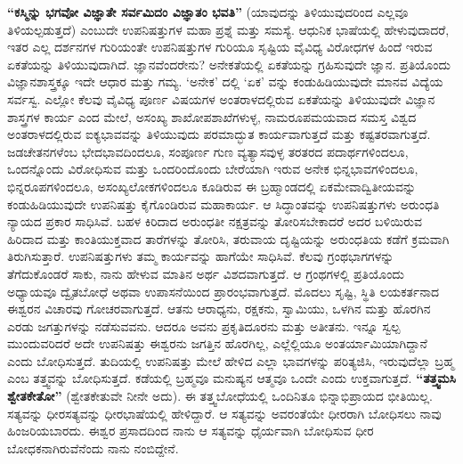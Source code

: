 \textbf{“ಕಸ್ಮಿನ್ನು ಭಗವೋ ವಿಜ್ಞಾತೇ ಸರ್ವಮಿದಂ ವಿಜ್ಞಾತಂ ಭವತಿ”} (ಯಾವುದನ್ನು ತಿಳಿಯುವುದರಿಂದ ಎಲ್ಲವೂ ತಿಳಿಯಲ್ಪಡುತ್ತದೆ) ಎಂಬುದೇ ಉಪನಿಷತ್ತುಗಳ ಮಹಾ ಪ್ರಶ್ನೆ ಮತ್ತು ಸಮಸ್ಯೆ. ಆಧುನಿಕ ಭಾಷೆಯಲ್ಲಿ ಹೇಳುವುದಾದರೆ, ಇತರ ಎಲ್ಲ ದರ್ಶನಗಳ ಗುರಿಯಂತೇ ಉಪನಿಷತ್ತುಗಳ ಗುರಿಯೂ ಸೃಷ್ಟಿಯ ವೈವಿಧ್ಯ ವಿರೋಧಗಳ ಹಿಂದೆ ಇರುವ ಏಕತೆಯನ್ನು ತಿಳಿಯುವುದಾಗಿದೆ. ಜ್ಞಾನವೆಂದರೇನು? ಅನೇಕತೆಯಲ್ಲಿ ಏಕತೆಯನ್ನು ಗ್ರಹಿಸುವುದೇ ಜ್ಞಾನ. ಪ್ರತಿಯೊಂದು ವಿಜ್ಞಾನಶಾಸ್ತ್ರಕ್ಕೂ ಇದೇ ಆಧಾರ ಮತ್ತು ಗಮ್ಯ. ‘ಅನೇಕ’ ದಲ್ಲಿ ‘ಏಕ’ ವನ್ನು ಕಂಡುಹಿಡಿಯುವುದೇ ಮಾನವ ವಿದ್ಯೆಯ ಸರ್ವಸ್ವ. ಎಲ್ಲೋ ಕೆಲವು ವೈವಿಧ್ಯ ಪೂರ್ಣ ವಿಷಯಗಳ ಅಂತರಾಳದಲ್ಲಿರುವ ಏಕತೆಯನ್ನು ತಿಳಿಯುವುದೇ ವಿಜ್ಞಾನ ಶಾಸ್ತ್ರಗಳ ಕಾರ್ಯ ಎಂದ ಮೇಲೆ, ಅಸಂಖ್ಯ ಶಾಖೋಪಶಾಖೆಗಳುಳ್ಳ, ನಾಮರೂಪಮಯವಾದ ಸಮಸ್ತ ವಿಶ್ವದ ಅಂತರಾಳದಲ್ಲಿರುವ ಐಕ್ಯಭಾವವನ್ನು ತಿಳಿಯುವುದು ಪರಮಾದ್ಭುತ ಕಾರ್ಯವಾಗುತ್ತದೆ ಮತ್ತು ಕಷ್ಟತರವಾಗುತ್ತದೆ. ಜಡಚೇತನಗಳೆಂಬ ಭೇದಭಾವದಿಂದಲೂ, ಸಂಪೂರ್ಣ ಗುಣ ವ್ಯತ್ಯಾಸವುಳ್ಳ ತರತರದ ಪದಾರ್ಥಗಳಿಂದಲೂ, ಒಂದನ್ನೊಂದು ವಿರೋಧಿಸುವ ಮತ್ತು ಒಂದರಿಂದೊಂದು ಬೇರೆಯಾಗಿ ಇರುವ ಅನೇಕ ಭಿನ್ನಭಾವಗಳಿಂದಲೂ, ಭಿನ್ನರೂಪಗಳಿಂದಲೂ, ಅಸಂಖ್ಯಲೋಕಗಳಿಂದಲೂ ಕೂಡಿರುವ ಈ ಬ್ರಹ್ಮಾಂಡದಲ್ಲಿ ಏಕಮೇವಾದ್ವಿತೀಯವನ್ನು ಕಂಡುಹಿಡಿಯುವುದೇ ಉಪನಿಷತ್ತು ಕೈಗೊಂಡಿರುವ ಮಹಾಕಾರ್ಯ. ಆ ಸಿದ್ಧಾಂತವನ್ನು ಉಪನಿಷತ್ತುಗಳು ಅರುಂಧತಿ ನ್ಯಾಯದ ಪ್ರಕಾರ ಸಾಧಿಸಿವೆ. ಬಹಳ ಕಿರಿದಾದ ಅರುಂಧತೀ ನಕ್ಷತ್ರವನ್ನು ತೋರಿಸಬೇಕಾದರೆ ಅದರ ಬಳಿಯಿರುವ ಹಿರಿದಾದ ಮತ್ತು ಕಾಂತಿಯುಕ್ತವಾದ ತಾರೆಗಳನ್ನು ತೋರಿಸಿ, ತರುವಾಯ ದೃಷ್ಟಿಯನ್ನು ಅರುಂಧತಿಯ ಕಡೆಗೆ ಕ್ರಮವಾಗಿ ತಿರುಗಿಸುತ್ತಾರೆ. ಉಪನಿಷತ್ತುಗಳು ತಮ್ಮ ಕಾರ್ಯವನ್ನು ಹಾಗೆಯೇ ಸಾಧಿಸಿವೆ. ಕೆಲವು ಗ್ರಂಥಭಾಗಗಳನ್ನು ತೆಗೆದುಕೊಂಡರೆ ಸಾಕು, ನಾನು ಹೇಳುವ ಮಾತಿನ ಅರ್ಥ ವಿಶದವಾಗುತ್ತದೆ. ಆ ಗ್ರಂಥಗಳಲ್ಲಿ ಪ್ರತಿಯೊಂದು ಅಧ್ಯಾಯವೂ ದ್ವೈತಬೋಧೆ ಅಥವಾ ಉಪಾಸನೆಯಿಂದ ಪ್ರಾರಂಭವಾಗುತ್ತದೆ. ಮೊದಲು ಸೃಷ್ಟಿ, ಸ್ಥಿತಿ ಲಯಕರ್ತನಾದ ಈಶ್ವರನ ವಿಚಾರವು ಗೋಚರವಾಗುತ್ತದೆ. ಆತನು ಆರಾಧ್ಯನು, ರಕ್ಷಕನು, ಸ್ವಾಮಿಯು, ಒಳಗಿನ ಮತ್ತು ಹೊರಗಿನ ಎರಡು ಜಗತ್ತುಗಳನ್ನು ನಡೆಸುವವನು. ಆದರೂ ಅವನು ಪ್ರಕೃತಿದೂರನು ಮತ್ತು ಅತೀತನು. ಇನ್ನೂ ಸ್ವಲ್ಪ ಮುಂದುವರಿದರೆ ಅದೇ ಉಪನಿಷತ್ತು ಈಶ್ವರನು ಜಗತ್ತಿನ ಹೊರಗಿಲ್ಲ, ಎಲ್ಲೆಲ್ಲಿಯೂ ಅಂತರ್ಯಾಮಿಯಾಗಿದ್ದಾನೆ ಎಂದು ಬೋಧಿಸುತ್ತದೆ. ತುದಿಯಲ್ಲಿ ಉಪನಿಷತ್ತು ಮೇಲೆ ಹೇಳಿದ ಎಲ್ಲಾ ಭಾವಗಳನ್ನು ಪರಿತ್ಯಜಿಸಿ, ಇರುವುದೆಲ್ಲಾ ಬ್ರಹ್ಮ ಎಂಬ ತತ್ತ್ವವನ್ನು ಬೋಧಿಸುತ್ತದೆ. ಕಡೆಯಲ್ಲಿ ಬ್ರಹ್ಮವೂ ಮನುಷ್ಯನ ಆತ್ಮವೂ ಒಂದೇ ಎಂದು ಉಕ್ತವಾಗುತ್ತದೆ. \textbf{“ತತ್ತ್ವಮಸಿ ಶ್ವೇತಕೇತೋ”} (ಶ್ವೇತಕೇತುವೇ ನೀನೇ ಅದು). ಈ ತತ್ತ್ವಬೋಧೆಯಲ್ಲಿ ಒಂದಿನಿತೂ ಭಿನ್ನಾಭಿಪ್ರಾಯದ ಭೀತಿಯಿಲ್ಲ. ಸತ್ಯವನ್ನು ಧೀರಸತ್ಯವನ್ನು ಧೀರಭಾಷೆಯಲ್ಲಿ ಹೇಳಿದ್ದಾರೆ. ಆ ಸತ್ಯವನ್ನು ಅವರಂತೆಯೇ ಧೀರರಾಗಿ ಬೋಧಿಸಲು ನಾವು ಹಿಂಜರಿಯಬಾರದು. ಈಶ್ವರ ಪ್ರಸಾದದಿಂದ ನಾನು ಆ ಸತ್ಯವನ್ನು ಧೈರ್ಯವಾಗಿ ಬೋಧಿಸುವ ಧೀರ ಬೋಧಕನಾಗಿರುವೆನೆಂದು ನಾನು ನಂಬಿದ್ದೇನೆ.


